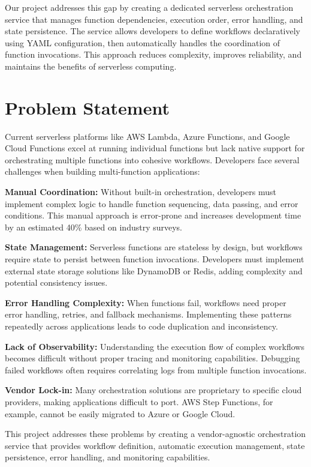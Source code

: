 \documentclass{fisatprojectfinal}
\begin{document}
Our project addresses this gap by creating a dedicated serverless orchestration service that manages function dependencies, execution order, error handling, and state persistence. The service allows developers to define workflows declaratively using YAML configuration, then automatically handles the coordination of function invocations. This approach reduces complexity, improves reliability, and maintains the benefits of serverless computing.

\section{Problem Statement}
Current serverless platforms like AWS Lambda, Azure Functions, and Google Cloud Functions excel at running individual functions but lack native support for orchestrating multiple functions into cohesive workflows. Developers face several challenges when building multi-function applications:

\textbf{Manual Coordination:} Without built-in orchestration, developers must implement complex logic to handle function sequencing, data passing, and error conditions. This manual approach is error-prone and increases development time by an estimated 40\% based on industry surveys.

\textbf{State Management:} Serverless functions are stateless by design, but workflows require state to persist between function invocations. Developers must implement external state storage solutions like DynamoDB or Redis, adding complexity and potential consistency issues.

\textbf{Error Handling Complexity:} When functions fail, workflows need proper error handling, retries, and fallback mechanisms. Implementing these patterns repeatedly across applications leads to code duplication and inconsistency.

\textbf{Lack of Observability:} Understanding the execution flow of complex workflows becomes difficult without proper tracing and monitoring capabilities. Debugging failed workflows often requires correlating logs from multiple function invocations.

\textbf{Vendor Lock-in:} Many orchestration solutions are proprietary to specific cloud providers, making applications difficult to port. AWS Step Functions, for example, cannot be easily migrated to Azure or Google Cloud.

This project addresses these problems by creating a vendor-agnostic orchestration service that provides workflow definition, automatic execution management, state persistence, error handling, and monitoring capabilities.
\end{document}
